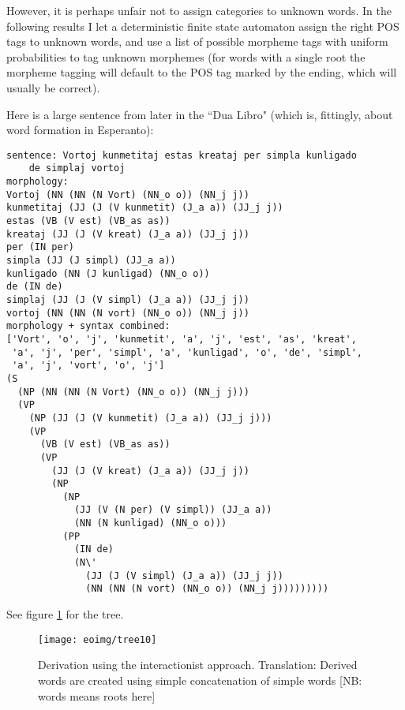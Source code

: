 \documentclass[10pt,a4paper]{article}
\begin{document}
However, it is perhaps unfair not to assign categories to unknown words. 
In the following results I let a deterministic finite state automaton
assign the right POS tags to unknown words, and use a list of possible
morpheme tags with uniform probabilities to tag unknown morphemes (for words
with a single root the morpheme tagging will default to the POS tag marked
by the ending, which will usually be correct).

Here is a large sentence from later in the ``Dua Libro" (which is, fittingly,
about word formation in Esperanto):

\begin{verbatim}
sentence: Vortoj kunmetitaj estas kreataj per simpla kunligado
	de simplaj vortoj
morphology:
Vortoj (NN (NN (N Vort) (NN_o o)) (NN_j j))
kunmetitaj (JJ (J (V kunmetit) (J_a a)) (JJ_j j))
estas (VB (V est) (VB_as as))
kreataj (JJ (J (V kreat) (J_a a)) (JJ_j j))
per (IN per)
simpla (JJ (J simpl) (JJ_a a))
kunligado (NN (J kunligad) (NN_o o))
de (IN de)
simplaj (JJ (J (V simpl) (J_a a)) (JJ_j j))
vortoj (NN (NN (N vort) (NN_o o)) (NN_j j))
morphology + syntax combined:
['Vort', 'o', 'j', 'kunmetit', 'a', 'j', 'est', 'as', 'kreat', 
 'a', 'j', 'per', 'simpl', 'a', 'kunligad', 'o', 'de', 'simpl',
 'a', 'j', 'vort', 'o', 'j']
(S
  (NP (NN (NN (N Vort) (NN_o o)) (NN_j j)))
  (VP
    (NP (JJ (J (V kunmetit) (J_a a)) (JJ_j j)))
    (VP
      (VB (V est) (VB_as as))
      (VP
        (JJ (J (V kreat) (J_a a)) (JJ_j j))
        (NP
          (NP
            (JJ (V (N per) (V simpl)) (JJ_a a))
            (NN (N kunligad) (NN_o o)))
          (PP
            (IN de)
            (N\'
              (JJ (J (V simpl) (J_a a)) (JJ_j j))
              (NN (NN (N vort) (NN_o o)) (NN_j j)))))))))
\end{verbatim}

See figure \ref{s3} for the tree.

\begin{figure}
\centering
\texttt{[image: eoimg/tree10]}
\caption{Derivation using the interactionist approach. Translation: Derived words are created using simple concatenation of simple words [NB: words means roots here]}
\label{s3}
\end{figure}
\end{document}

